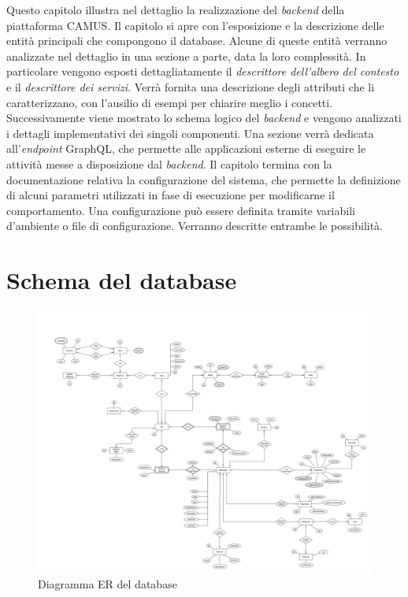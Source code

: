 Questo capitolo illustra nel dettaglio la realizzazione del \emph{backend} della piattaforma CAMUS. Il capitolo si apre con l'esposizione e la descrizione delle entità principali che compongono il database. Alcune di queste entità verranno analizzate nel dettaglio in una sezione a parte, data la loro complessità. In particolare vengono esposti dettagliatamente il \emph{descrittore dell'albero del contesto} e il \emph{descrittore dei servizi}. Verrà fornita una descrizione degli attributi che li caratterizzano, con l'ausilio di esempi per chiarire meglio i concetti. Successivamente viene mostrato lo schema logico del \emph{backend} e vengono analizzati i dettagli implementativi dei singoli componenti. Una sezione verrà dedicata all'\emph{endpoint} GraphQL, che permette alle applicazioni esterne di eseguire le attività messe a disposizione dal \emph{backend}. Il capitolo termina con la documentazione relativa la configurazione del sistema, che permette la definizione di alcuni parametri utilizzati in fase di esecuzione per modificarne il comportamento. Una configurazione può essere definita tramite variabili d'ambiente o file di configurazione. Verranno descritte entrambe le possibilità.

\section{Schema del database\label{sec:schema-database}}

\begin{figure}[p]
	\centering
	\includegraphics[height=\textwidth, angle=90]{5-implementazione-backend/Immagini/schema_er_db.png}
	\caption{Diagramma ER del database}\label{fig:schema-er-db}
\end{figure}

